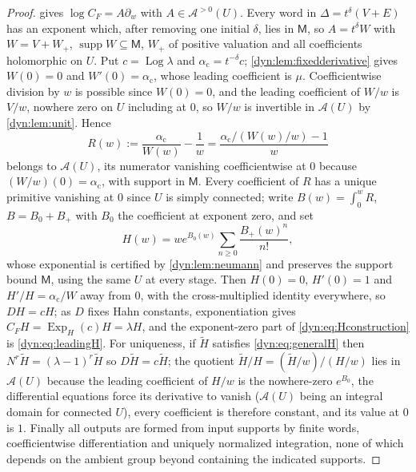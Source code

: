 \documentclass[11pt,letterpaper]{article}
\theoremstyle{definition}
\theoremstyle{remark}
\newcommand{\AAA}{\mathscr A}
\newcommand{\supp}{\operatorname{supp}}
\newcommand{\Log}{\operatorname{Log}}
\newcommand{\ExpH}{\operatorname{Exp}_{\!H}}
\numberwithin{equation}{section}
\begin{document}
\begin{proof}
 gives $\log C_F=A\partial_w$ with
$A\in\AAA^{>0}(U)$. Every word in $\Delta=t^{\delta}(V+E)$ has an exponent
which, after removing one initial $\delta$, lies in $\mathsf M$, so
$A=t^{\delta}W$ with $W=V+W_+$, $\supp W\subseteq\mathsf M$, $W_+$ of
positive valuation and all coefficients holomorphic on $U$. Put
$c=\Log\lambda$ and $\alpha_{\mathrm c}=t^{-\delta}c$;
\cref{dyn:lem:fixedderivative} gives $W(0)=0$ and
$W'(0)=\alpha_{\mathrm c}$, whose leading coefficient is $\mu$.
Coefficientwise division by $w$ is possible since $W(0)=0$, and the leading
coefficient of $W/w$ is $V/w$, nowhere zero on $U$ including at $0$, so
$W/w$ is invertible in $\AAA(U)$ by \cref{dyn:lem:unit}. Hence
\begin{equation}\label{dyn:eq:regularR}
 R(w):=\frac{\alpha_{\mathrm c}}{W(w)}-\frac1w
 =\frac{\alpha_{\mathrm c}/(W(w)/w)-1}{w}
\end{equation}
belongs to $\AAA(U)$, its numerator vanishing coefficientwise at $0$
because $(W/w)(0)=\alpha_{\mathrm c}$, with support in $\mathsf M$. Every
coefficient of $R$ has a unique primitive vanishing at $0$ since $U$ is
simply connected; write $B(w)=\int_0^{w}R$, $B=B_0+B_+$ with $B_0$ the
coefficient at exponent zero, and set
\begin{equation}\label{dyn:eq:Hconstruction}
 H(w)=we^{B_0(w)}\sum_{n\ge0}\frac{B_+(w)^{n}}{n!},
\end{equation}
whose exponential is certified by \cref{dyn:lem:neumann} and preserves the
support bound $\mathsf M$, using the same $U$ at every stage. Then
$H(0)=0$, $H'(0)=1$ and $H'/H=\alpha_{\mathrm c}/W$ away from $0$, with the
cross-multiplied identity everywhere, so $DH=cH$; as $D$ fixes Hahn
constants, exponentiation gives $C_FH=\ExpH(c)H=\lambda H$, and the
exponent-zero part of \eqref{dyn:eq:Hconstruction} is
\eqref{dyn:eq:leadingH}. For uniqueness, if $\widetilde H$ satisfies
\eqref{dyn:eq:generalH} then $N^{r}\widetilde H=(\lambda-1)^{r}\widetilde H$
so $D\widetilde H=c\widetilde H$; the quotient
$\widetilde H/H=(\widetilde H/w)/(H/w)$ lies in $\AAA(U)$ because the
leading coefficient of $H/w$ is the nowhere-zero $e^{B_0}$, the
differential equations force its derivative to vanish ($\AAA(U)$ being an
integral domain for connected $U$), every coefficient is therefore
constant, and its value at $0$ is $1$. Finally all outputs are formed from
input supports by finite words, coefficientwise differentiation and
uniquely normalized integration, none of which depends on the ambient group
beyond containing the indicated supports.
\end{proof}
\end{document}
